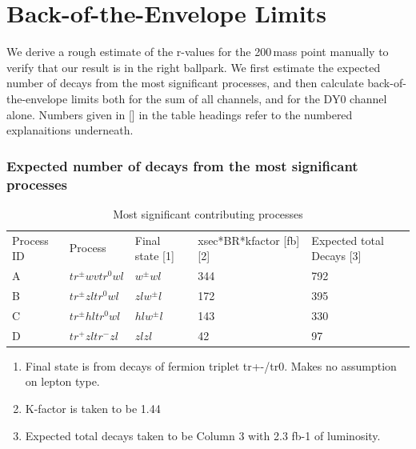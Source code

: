 \chapter{Back-of-the-Envelope Limits}

We derive a rough estimate of the r-values for the 200\,\GeV mass point manually to verify that our result is in the right ballpark. We first estimate the expected number of decays from the most significant processes, and then calculate back-of-the-envelope limits both for the sum of all channels, and for the DY0 channel alone. Numbers given in [] in the table headings refer to the numbered explanaitions underneath.

\subsection*{Expected number of decays from the most significant processes}

\begin{table}[h!]
\centering
\caption{Most significant contributing processes} %
\begin{tabular}{lllll}
Process ID & Process                                         & Final state [1] & xsec*BR*kfactor [fb] [2] & Expected total Decays [3] \\
A          & $tr^\pm wvtr^0wl$ & $w^\pm w l$             & 344                              & 792                           \\
B          & $tr^\pm zltr^0wl$ & $z l w^\pm l$           & 172                              & 395                           \\
C          & $tr^\pm hltr^0wl$ & $h l w^\pm l$           & 143                              & 330                           \\
D          & $tr^+zltr^- zl$  & $z l z l$             & 42                               & 97                           
\end{tabular}
\end{table}

\begin{enumerate}
	\item Final state is from decays of fermion triplet tr+-/tr0. Makes no assumption on lepton type.
	\item K-factor is taken to be 1.44
	\item Expected total decays taken to be Column 3 with 2.3 fb-1 of luminosity.
\end{enumerate}


